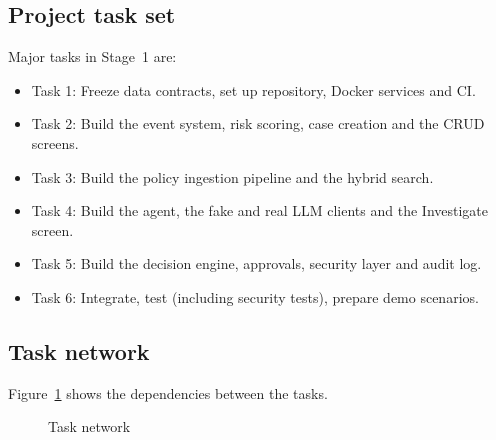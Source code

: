 \documentclass[oneside,a4paper,12pt]{report}
\begin{document}
\subsection{Project task set}
Major tasks in Stage~1 are:
\begin{itemize}
  \item Task 1: Freeze data contracts, set up repository, Docker services and CI.
  \item Task 2: Build the event system, risk scoring, case creation and the CRUD screens.
  \item Task 3: Build the policy ingestion pipeline and the hybrid search.
  \item Task 4: Build the agent, the fake and real LLM clients and the Investigate screen.
  \item Task 5: Build the decision engine, approvals, security layer and audit log.
  \item Task 6: Integrate, test (including security tests), prepare demo scenarios.
\end{itemize}

\subsection{Task network}
Figure~\ref{fig:tasknet} shows the dependencies between the tasks.
\begin{figure}[H]
\centering
{}
\caption{Task network}
\label{fig:tasknet}
\end{figure}
\end{document}
